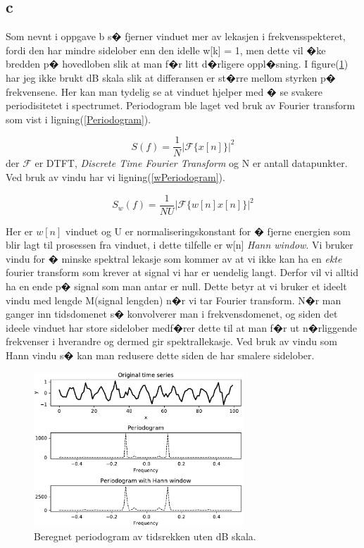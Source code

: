 {\subsection{c}

Som nevnt i oppgave b s� fjerner vinduet mer av lekasjen i frekvensspekteret, fordi den har mindre sidelober enn den idelle w[k] = 1, men dette vil �ke bredden p� hovedloben slik at man f�r litt d�rligere oppl�sning. I figure(\ref{taskc}) har jeg ikke brukt dB skala slik at differansen er st�rre mellom styrken p� frekvensene. Her kan man tydelig se at vinduet hjelper med � se svakere periodisitetet i spectrumet. Periodogram ble laget ved bruk av Fourier transform som vist i ligning(\ref{Periodogram}).

\begin{equation}
    S(f) = \frac{1}{N}|\mathcal{F}\{x[n]\}|^{2}
    \label{Periodogram}
\end{equation}
der $\mathcal{F}$ er DTFT, \emph{Discrete Time Fourier Transform} og N er antall datapunkter. Ved bruk av vindu har vi ligning(\ref{wPeriodogram}).

\begin{equation}
    S_{w}(f) = \frac{1}{NU}|\mathcal{F}\{w[n]x[n]\}|^{2}
    \label{wPeriodogram}
\end{equation}

Her er $w[n]$ vinduet og U er normaliseringskonstant for � fjerne energien som blir lagt til prosessen fra vinduet, i dette tilfelle er w[n] \emph{Hann window}. Vi bruker vindu for � minske spektral lekasje som kommer av at vi ikke kan ha en \emph{ekte} fourier transform som krever at signal vi har er uendelig langt. Derfor vil vi alltid ha en ende p� signal som man antar er null. Dette betyr at vi bruker et ideelt vindu med lengde M(signal lengden) n�r vi tar Fourier transform. N�r man ganger inn tidsdomenet s� konvolverer man i frekvensdomenet, og siden det ideele vinduet har store sidelober medf�rer dette til at man f�r ut n�rliggende frekvenser i hverandre og dermed gir spektrallekasje. Ved bruk av vindu som Hann vindu s� kan man redusere dette siden de har smalere sidelober.



\begin{figure}[hbt!]
    {\centering
        \includegraphics[width=0.70\textwidth]{taskc.pdf}
        \caption{Beregnet periodogram av tidsrekken uten dB skala.}
        \label{taskc}
    \par}
    \end{figure}

}
